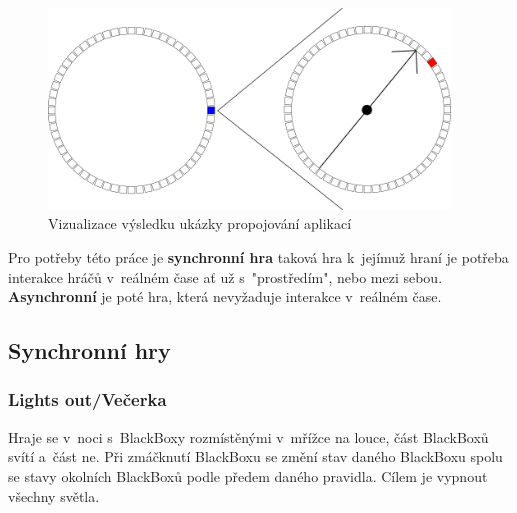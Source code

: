 \newpage



\begin{figure}[H]
    \begin{small}
        \begin{center}
            \includegraphics[width=0.95\textwidth]{img/appLink.png}
        \end{center}
        \caption{Vizualizace výsledku ukázky propojování aplikací}
        \label{fig:appLink}
    \end{small}
\end{figure}

\newpage



\newpage

Pro potřeby této práce je \textbf{synchronní hra} taková hra k~jejímuž hraní je potřeba interakce hráčů v~reálném čase ať už s~"prostředím", nebo mezi sebou.
\textbf{Asynchronní} je poté hra, která nevyžaduje interakce v~reálném čase.

\subsection{Synchronní hry}

\subsubsection{Lights out/Večerka}

Hraje se v~noci s~BlackBoxy rozmístěnými v~mřížce na louce, část BlackBoxů svítí a~část ne.
Při zmáčknutí BlackBoxu se změní stav daného BlackBoxu spolu se stavy okolních BlackBoxů podle předem daného pravidla.
Cílem je vypnout všechny světla.

